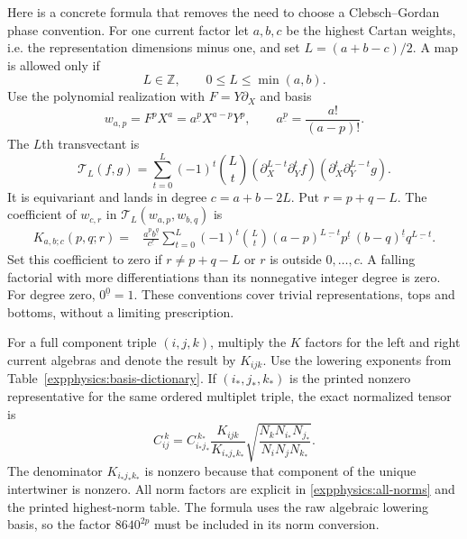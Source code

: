 Here is a concrete formula that removes the need to choose a
Clebsch--Gordan phase convention. For one current factor let $a,b,c$
be the highest Cartan weights, i.e. the representation dimensions
minus one, and set $L=(a+b-c)/2$. A map is allowed only if
\[
 L\in\mathbb Z,\qquad0\leq L\leq\min(a,b).
\]
Use the polynomial realization with $F=Y\partial_X$ and basis
\[
 w_{a,p}=F^pX^a=a^{\underline p}X^{a-p}Y^p,
 \qquad a^{\underline p}=\frac{a!}{(a-p)!}.
\]
The $L$th transvectant is
\begin{equation}
 \mathcal T_L(f,g)=\sum_{t=0}^{L}(-1)^t\binom Lt
 (\partial_X^{L-t}\partial_Y^tf)
 (\partial_X^t\partial_Y^{L-t}g).
 \label{expphysics:transvectant-definition}
\end{equation}
It is equivariant and lands in degree $c=a+b-2L$. Put $r=p+q-L$.
The coefficient of $w_{c,r}$ in
$\mathcal T_L(w_{a,p},w_{b,q})$ is
\begin{equation}
 \begin{split}
 K_{a,b;c}(p,q;r)
 ={}&\frac{a^{\underline p}b^{\underline q}}{c^{\underline r}}
 \sum_{t=0}^{L}(-1)^t\binom Lt
 (a-p)^{\underline{L-t}}p^{\underline t}\,
 (b-q)^{\underline t}q^{\underline{L-t}}.
 \end{split}
 \label{expphysics:K-formula}
\end{equation}
Set this coefficient to zero if $r\ne p+q-L$ or $r$ is outside
$0,\ldots,c$. A falling factorial with more differentiations than
its nonnegative integer degree is zero. For degree zero,
$0^{\underline0}=1$. These conventions cover trivial representations,
tops and bottoms, without a limiting prescription.

For a full component triple $(i,j,k)$, multiply the $K$ factors
for the left and right current algebras and denote the result by
$K_{ijk}$. Use the lowering exponents from
Table~\ref{expphysics:basis-dictionary}. If $(i_*,j_*,k_*)$ is the
printed nonzero representative for the same ordered multiplet
triple, the exact normalized tensor is
\begin{equation}
 \boxed{\displaystyle
 C_{ij}^{\ k}=C_{i_*j_*}^{\ k_*}
 \frac{K_{ijk}}{K_{i_*j_*k_*}}
 \sqrt{\frac{N_kN_{i_*}N_{j_*}}
              {N_iN_jN_{k_*}}}.}
 \label{expphysics:full-reconstruction}
\end{equation}
The denominator $K_{i_*j_*k_*}$ is nonzero because that component
of the unique intertwiner is nonzero. All norm factors are explicit
in \eqref{expphysics:all-norms} and the printed highest-norm table.
The formula uses the raw algebraic lowering basis, so the factor
$8640^{2p}$ must be included in its norm conversion.

